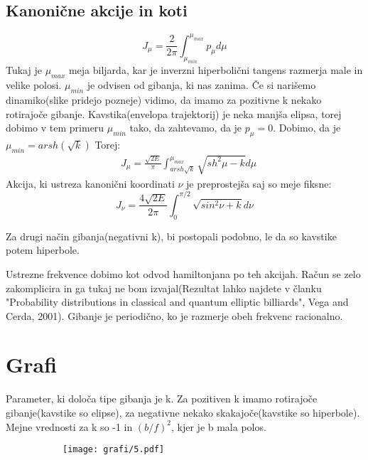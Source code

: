 \documentclass{article}
\begin{document}
\subsection{Kanonične akcije in koti}
\begin{equation*}
J_{\mu} = \frac{2}{2\pi} \int_{\mu_{min}}^{\mu_{max}} p_{\mu} d\mu
\end{equation*}
Tukaj je $\mu_{max}$ meja biljarda, kar je inverzni hiperbolični tangens razmerja male in velike polosi.
$\mu_{min}$ je odvisen od gibanja, ki nas zanima. Če si narišemo dinamiko(slike pridejo pozneje) vidimo, da imamo za pozitivne k nekako rotirajoče gibanje. Kavstika(envelopa trajektorij) je neka manjša elipsa, torej dobimo v tem primeru $\mu_{min}$ tako, da zahtevamo, da je $p_{\mu}=0$.
Dobimo, da je $\mu_{min} = arsh(\sqrt{k})$
Torej:
\begin{align*}
&J_{\mu} = \frac{\sqrt{2E}}{\pi} \int_{arsh\sqrt{k}}^{\mu_{max}} \sqrt{sh^2 \mu - k} d\mu 
\end{align*}
Akcija, ki ustreza kanonični koordinati $\nu$ je preprostejša saj so meje fiksne:
\begin{equation*}
J_{\nu} = \frac{4\sqrt{2E}}{2 \pi} \int_0^{\pi/2} \sqrt{sin^2 \nu + k} d\nu 
\end{equation*}

Za drugi način gibanja(negativni k), bi postopali podobno, le da so kavstike potem hiperbole.


Ustrezne frekvence dobimo kot odvod hamiltonjana po teh akcijah. Račun se zelo zakomplicira in ga tukaj ne bom izvajal(Rezultat lahko najdete v članku "Probability distributions in classical and quantum elliptic billiards", Vega and Cerda, 2001).
Gibanje je periodično, ko je razmerje obeh frekvenc racionalno.

\section{Grafi}

Parameter, ki določa tipe gibanja je k. Za pozitiven k imamo rotirajoče gibanje(kavstike so elipse), za negativne nekako skakajoče(kavstike so hiperbole).
Mejne vrednosti za k so -1 in $(b/f)^2$, kjer je b mala polos.

\begin{figure}[H]
\centering
\begin{subfigure}{.7\textwidth}
\texttt{[image: grafi/5.pdf]}
\end{subfigure}
\end{figure}
\end{document}
